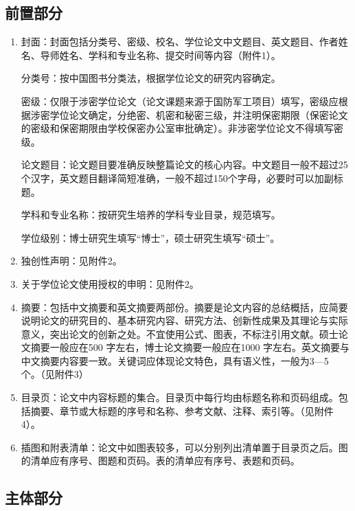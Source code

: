 \documentclass[twoside,longtitle]{LZUthesis}
\begin{document}
\subsection{前置部分}
\begin{enumerate}
\item 封面：封面包括分类号、密级、校名、学位论文中文题目、英文题目、作者姓名、导师姓名、学科和专业名称、提交时间等内容（附件1）。


分类号：按中国图书分类法，根据学位论文的研究内容确定。


密级：仅限于涉密学位论文（论文课题来源于国防军工项目）填写，密级应根据涉密学位论文确定，分绝密、机密和秘密三级，并注明保密期限（保密论文的密级和保密期限由学校保密办公室审批确定）。非涉密学位论文不得填写密级。


论文题目：论文题目要准确反映整篇论文的核心内容。中文题目一般不超过25 个汉字，英文题目翻译简短准确，一般不超过150个字母，必要时可以加副标题。


学科和专业名称：按研究生培养的学科专业目录，规范填写。


学位级别：博士研究生填写“博士”，硕士研究生填写“硕士”。

\item 独创性声明：见附件2。
\item 关于学位论文使用授权的申明：见附件2。
\item 摘要：包括中文摘要和英文摘要两部份。摘要是论文内容的总结概括，应简要说明论文的研究目的、基本研究内容、研究方法、创新性成果及其理论与实际意义，突出论文的创新之处。不宜使用公式、图表，不标注引用文献。硕士论文摘要一般应在500 字左右，博士论文摘要一般应在1000 字左右。英文摘要与中文摘要内容要一致。关键词应体现论文特色，具有语义性，一般为3—5 个。（见附件3）
\item 目录页：论文中内容标题的集合。目录页中每行均由标题名称和页码组成。包括摘要、章节或大标题的序号和名称、参考文献、注释、索引等。（见附件4）。
\item 插图和附表清单：论文中如图表较多，可以分别列出清单置于目录页之后。图的清单应有序号、图题和页码。表的清单应有序号、表题和页码。
\end{enumerate}

\subsection{主体部分}
\end{document}
